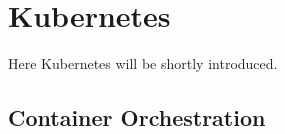 \newpage
\section{Kubernetes}
Here Kubernetes will be shortly introduced.

\subsection{Container Orchestration}